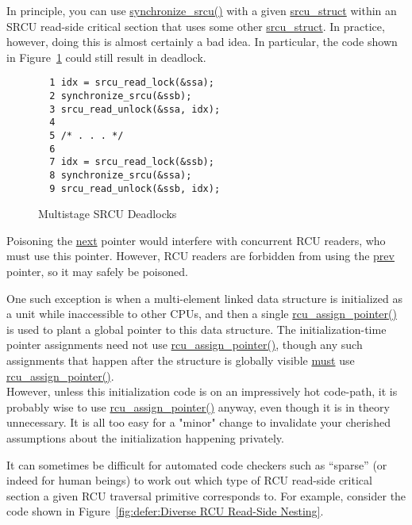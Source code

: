 In principle, you can use
\url{synchronize_srcu()} with a given \url{srcu_struct}
within an SRCU read-side critical section that uses some other
\url{srcu_struct}.
In practice, however, doing this is almost certainly a bad idea.
In particular, the code shown in
Figure~\ref{fig:defer:Multistage SRCU Deadlocks}
could still result in deadlock.

\begin{figure}[htbp]
{ \centering
\begin{verbatim}
  1 idx = srcu_read_lock(&ssa);
  2 synchronize_srcu(&ssb);
  3 srcu_read_unlock(&ssa, idx);
  4 
  5 /* . . . */
  6 
  7 idx = srcu_read_lock(&ssb);
  8 synchronize_srcu(&ssa);
  9 srcu_read_unlock(&ssb, idx);
\end{verbatim}
}
\caption{Multistage SRCU Deadlocks}
\label{fig:defer:Multistage SRCU Deadlocks}
\end{figure}



Poisoning the \url{next} pointer would interfere
with concurrent RCU readers, who must use this pointer.
However, RCU readers are forbidden from using the \url{prev}
pointer, so it may safely be poisoned.


One such exception is when a multi-element linked
data structure is initialized as a unit while inaccessible to other
CPUs, and then a single \url{rcu_assign_pointer()} is used
to plant a global pointer to this data structure.
The initialization-time pointer assignments need not use
\url{rcu_assign_pointer()}, though any such assignments that
happen after the structure is globally visible \url{must} use
\url{rcu_assign_pointer()}.
\\
However, unless this initialization code is on an impressively hot
code-path, it is probably wise to use \url{rcu_assign_pointer()}
anyway, even though it is in theory unnecessary.
It is all too easy for a "minor" change to invalidate your cherished
assumptions about the initialization happening privately.


It can sometimes be difficult for automated
code checkers such as ``sparse'' (or indeed for human beings) to
work out which type of RCU read-side critical section a given
RCU traversal primitive corresponds to.
For example, consider the code shown in
Figure~\ref{fig:defer:Diverse RCU Read-Side Nesting}.

